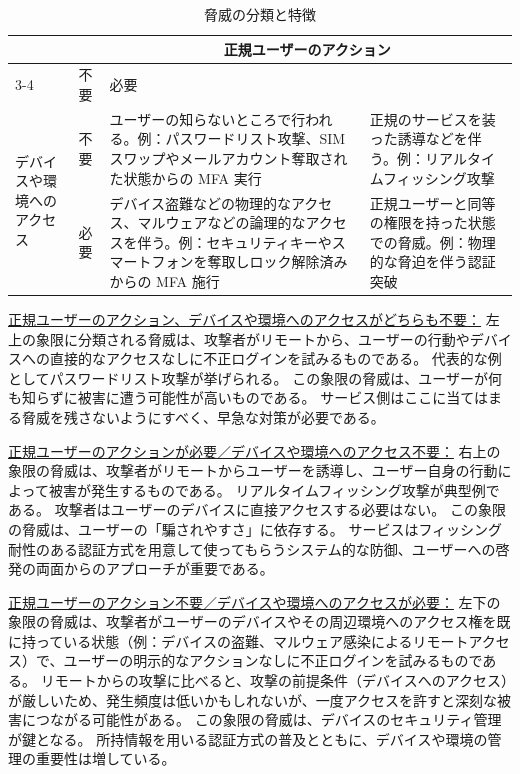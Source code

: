 \documentclass[uplatex]{jsarticle}
\def\label#1{}%
\begin{document}
\begin{table}[H]
\centering
\caption{脅威の分類と特徴}\label{tab:ch2-threat-quadrants}
\begin{tabular}{|p{}|p{}|p{}|p{}|}
\hline
\multicolumn{2}{|c|}{} & \multicolumn{2}{c|}{正規ユーザーのアクション} \\ \cline{3-4}
\multicolumn{2}{|c|}{} & 不要 & 必要 \\ \hline
\multirow{6}{=}{デバイスや環境へのアクセス}
& 不要 & ユーザーの知らないところで行われる。\newline 例：パスワードリスト攻撃、SIM スワップやメールアカウント奪取された状態からの MFA 実行 & 正規のサービスを装った誘導などを伴う。\newline 例：リアルタイムフィッシング攻撃 \\ \cline{2-4}
& 必要 & デバイス盗難などの物理的なアクセス、マルウェアなどの論理的なアクセスを伴う。\newline 例：セキュリティキーやスマートフォンを奪取しロック解除済みからの MFA 施行 & 正規ユーザーと同等の権限を持った状態での脅威。\newline 例：物理的な脅迫を伴う認証突破 \\ \hline
\end{tabular}
\end{table}

\underline{正規ユーザーのアクション、デバイスや環境へのアクセスがどちらも不要：}
左上の象限に分類される脅威は、攻撃者がリモートから、ユーザーの行動やデバイスへの直接的なアクセスなしに不正ログインを試みるものである。
代表的な例としてパスワードリスト攻撃が挙げられる。
この象限の脅威は、ユーザーが何も知らずに被害に遭う可能性が高いものである。
サービス側はここに当てはまる脅威を残さないようにすべく、早急な対策が必要である。

\underline{正規ユーザーのアクションが必要／デバイスや環境へのアクセス不要：}
右上の象限の脅威は、攻撃者がリモートからユーザーを誘導し、ユーザー自身の行動によって被害が発生するものである。
リアルタイムフィッシング攻撃が典型例である。
攻撃者はユーザーのデバイスに直接アクセスする必要はない。
この象限の脅威は、ユーザーの「騙されやすさ」に依存する。
サービスはフィッシング耐性のある認証方式を用意して使ってもらうシステム的な防御、ユーザーへの啓発の両面からのアプローチが重要である。

\underline{正規ユーザーのアクション不要／デバイスや環境へのアクセスが必要：}
左下の象限の脅威は、攻撃者がユーザーのデバイスやその周辺環境へのアクセス権を既に持っている状態（例：デバイスの盗難、マルウェア感染によるリモートアクセス）で、ユーザーの明示的なアクションなしに不正ログインを試みるものである。
リモートからの攻撃に比べると、攻撃の前提条件（デバイスへのアクセス）が厳しいため、発生頻度は低いかもしれないが、一度アクセスを許すと深刻な被害につながる可能性がある。
この象限の脅威は、デバイスのセキュリティ管理が鍵となる。
所持情報を用いる認証方式の普及とともに、デバイスや環境の管理の重要性は増している。
\end{document}
